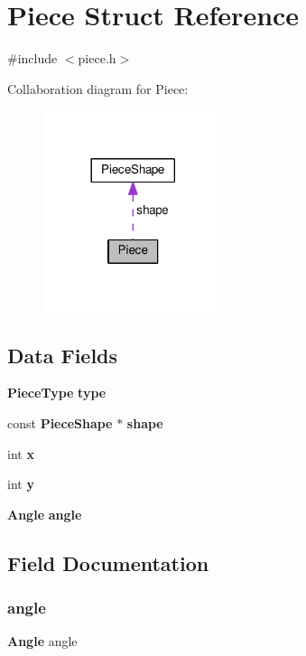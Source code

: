 \section{Piece Struct Reference}
\label{structPiece}


{\ttfamily \#include $<$piece.\+h$>$}



Collaboration diagram for Piece\+:
\nopagebreak
\begin{figure}[H]
\begin{center}
\leavevmode
\includegraphics[width=149pt]{structPiece__coll__graph}
\end{center}
\end{figure}
\subsection*{Data Fields}
\begin{DoxyCompactItemize}
\item 
\textbf{ Piece\+Type} \textbf{ type}
\item 
const \textbf{ Piece\+Shape} $\ast$ \textbf{ shape}
\item 
int \textbf{ x}
\item 
int \textbf{ y}
\item 
\textbf{ Angle} \textbf{ angle}
\end{DoxyCompactItemize}


\subsection{Field Documentation}
\mbox{\label{structPiece_ada2a4e7499e58efcb049762e1d961c4e}} 
\subsubsection{angle}
{\footnotesize\ttfamily \textbf{ Angle} angle}

